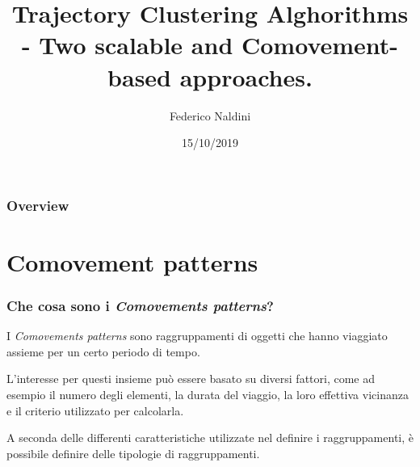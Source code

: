 \documentclass{beamer}
\title[Trajectory Clustering survey]{Trajectory Clustering Alghorithms - Two scalable and Comovement-based approaches. } %
\author{Federico Naldini} %
\institute[Università di Bologna] %
{
Alma Mater Studiorum - Università di Bologna, Cesena. \\ %
\medskip
\textit{federico.naldini3@studio.unibo.it} %
}
\date{15/10/2019} %
\begin{document}
\begin{frame}
\titlepage %
\end{frame}

\begin{frame}
\frametitle{Overview} %
\tableofcontents %
\end{frame}

\section{Comovement patterns} %

\begin{frame}

\frametitle{Che cosa sono i \textit{Comovements patterns}?}
I \textit{Comovements patterns} sono raggruppamenti di oggetti che hanno viaggiato assieme per un certo periodo di tempo.

L'interesse per questi insieme può essere basato su diversi fattori, come ad esempio il numero degli elementi, la durata del viaggio,
la loro effettiva vicinanza e il criterio utilizzato per calcolarla.

A seconda delle differenti caratteristiche utilizzate nel definire i raggruppamenti, è possibile definire delle tipologie di raggruppamenti.

\end{frame}
\end{document}
